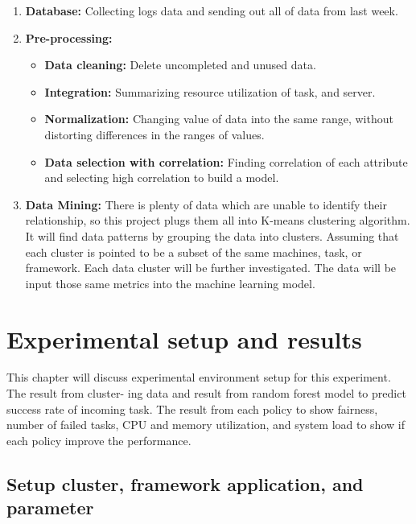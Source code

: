 \documentclass[12pt,oneside,openright,a4paper]{cpe-english-project}
\begin{document}
\begin{enumerate}
  \item \textbf{Database: } Collecting logs data and sending out all of data from last week.
  \item \textbf{Pre-processing: }
    \begin{itemize}
      \item \textbf{Data cleaning: } Delete uncompleted and unused data. 
      \item \textbf{Integration: } Summarizing resource utilization of task, and server.
      \item \textbf{Normalization: } Changing value of data into the same range, without distorting differences in the ranges of values.
      \item \textbf{Data selection with correlation: } Finding correlation of each attribute and selecting high correlation to build a model.
    \end{itemize}
  \item \textbf{Data Mining: } There is plenty of data which are unable to identify their relationship, so this project plugs them all into K-means clustering algorithm. It will find data patterns by grouping the data into clusters. Assuming that each cluster is pointed to be a subset of the same machines, task, or framework. Each data cluster will be further investigated. The data will be input those same metrics into the machine learning model.
\end{enumerate}
\chapter{Experimental setup and results}

\hspace{10mm}This chapter will discuss experimental environment setup for this experiment. The result from cluster- ing data and result from random forest model to predict success rate of incoming task. The result from each policy to show fairness, number of failed tasks, CPU and memory utilization, and system load to show if each policy improve the performance.

\section{Setup cluster, framework application, and parameter}
\end{document}
